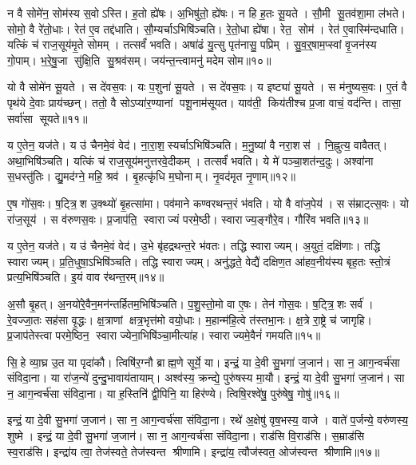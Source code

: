 न वै सोमे॑न॒ सोम॑स्य स॒वोऽस्ति।
ह॒तो ह्ये॑षः।
अ॒भिषु॑तो॒ ह्ये॑षः।
न हि ह॒तः सू॒यते।
सौ॒मी सू॒तव॑शा॒मा ल॑भते।
सोमो॒ वै रे॑तो॒धाः।
रेत॑ ए॒व तद्द॑धाति।
सौ॒म्यर्चाऽभिषि॑ञ्चति।
रे॒तो॒धा ह्ये॑षा।
रेत॒ सोम॑।
रेत॑ ए॒वास्मि॑न्दधाति।
यत्किं च॑ राज॒सूय॑मृ॒ते सोमम्।
तत्सर्वं॑ भवति।
अषा॑ढं यु॒त्सु पृत॑नासु॒ पप्रिम्।
सु॒व॒र्॒षाम॒प्स्वां वृ॒जन॑स्य गो॒पाम्।
भ॒रे॒षु॒जा सु॑क्षि॒ति सु॒श्रव॑सम्।
जय॑न्त॒न्त्वामनु॑ मदेम सोम॥१०॥\anuvakamend[रेत॒ सोम॑ स॒प्त च॑]

यो वै सोमे॑न सू॒यते।
स दे॑वस॒वः।
यः प॒शुना॑ सू॒यते।
स दे॑वस॒वः।
य इष्ट्या॑ सू॒यते।
स म॑नुष्यस॒वः।
ए॒तं वै पृथ॑ये दे॒वाः प्राय॑च्छन्।
ततो॒ वै सोऽप्या॑र॒ण्यानां पशू॒नाम॑सूयत।
याव॑ती॒ किय॑तीश्च प्र॒जा वाचं॒ वद॑न्ति।
तासा॒ सर्वा॑सा सूयते॥११॥

य ए॒तेन॒ यज॑ते।
य उ॑ चैनमे॒वं वेद॑।
ना॒रा॒श॒स्यर्चाऽभिषि॑ञ्चति।
म॒नु॒ष्या॑ वै नरा॒शस॑।
नि॒ह्नुत्य॒ वावैतत्।
अथा॒भिषि॑ञ्चति।
यत्किं च॑ राज॒सूय॑मनुत्तरवे॒दीकम्।
तत्सर्वं॑ भवति।
ये मे॑ पञ्चा॒शत॑न्द॒दुः।
अश्वा॑ना स॒धस्तु॑तिः।
द्यु॒मद॑ग्ने॒ महि॒ श्रव॑।
बृ॒हत्कृ॑धि म॒घोनाम्।
नृ॒वद॑मृत नृ॒णाम्॥१२॥\anuvakamend[सू॒य॒ते॒ स॒धस्तु॑ति॒स्त्रीणि॑ च]

ए॒ष गो॑स॒वः।
ष॒ट्त्रि॒श उ॒क्थ्यो॑ बृ॒हत्सा॑मा।
पव॑माने कण्वरथन्त॒रं भ॑वति।
यो वै वा॑ज॒पेय॑।
स स॑म्राट्त्स॒वः।
यो रा॑ज॒सूय॑।
स व॑रुणस॒वः।
प्र॒जाप॑ति॒ स्वाराज्यं परमे॒ष्ठी।
स्वाराज्य॒ङ्गौरे॒व।
गौरि॑व भवति॥१३॥

य ए॒तेन॒ यज॑ते।
य उ॑ चैनमे॒वं वेद॑।
उ॒भे बृ॑हद्रथन्त॒रे भ॑वतः।
तद्धि स्वाराज्यम्।
अ॒युतं॒ दक्षि॑णाः।
तद्धि स्वाराज्यम्।
प्र॒ति॒धुषा॒ऽभिषि॑ञ्चति।
तद्धि स्वाराज्यम्।
अनु॑द्धते॒ वेद्यै॑ दक्षिण॒त आ॑हव॒नीय॑स्य बृह॒तः स्तो॒त्रं प्रत्य॒भिषि॑ञ्चति।
इ॒यं वाव र॑थन्त॒रम्॥१४॥

अ॒सौ बृ॒हत्।
अ॒नयो॑रे॒वैन॒मन॑न्तर्\mbox{}हितम॒भिषि॑ञ्चति।
प॒शु॒स्तो॒मो वा ए॒षः।
तेन॑ गोस॒वः।
ष॒ट्त्रि॒शः सर्व॑।
रे॒वज्जा॒तः सह॑सा वृ॒द्धः।
क्ष॒त्राणां क्षत्र॒भृत्त॑मो वयो॒धाः।
म॒हान्म॑हि॒त्वे त॑स्तभा॒नः।
क्ष॒त्रे रा॒ष्ट्रे च॑ जागृहि।
प्र॒जाप॑तेस्त्वा परमे॒ष्ठिन॒ स्वाराज्येना॒भिषि॑ञ्चा॒मीत्या॑ह।
स्वाराज्यमे॒वैनं॑ गमयति॥१५॥\anuvakamend[इ॒व॒ भ॒व॒ति॒ र॒थ॒न्त॒रमा॒हैकं च]

सि॒हे व्या॒घ्र उ॒त या पृदा॑कौ।
त्विषि॑र॒ग्नौ ब्राह्म॒णे सूर्ये॒ या।
इन्द्रं॒ या दे॒वी सु॒भगा॑ ज॒जान॑।
सा न॒ आग॒न्वर्च॑सा संविदा॒ना।
या रा॑ज॒न्ये॑ दुन्दु॒भावाय॑तायाम्।
अश्व॑स्य॒ क्रन्द्ये॒ पुरु॑षस्य मा॒यौ।
इन्द्रं॒ या दे॒वी सु॒भगा॑ ज॒जान॑।
सा न॒ आग॒न्वर्च॑सा संविदा॒ना।
या ह॒स्तिनि॑ द्वी॒पिनि॒ या हिर॑ण्ये।
त्विषि॒रश्वे॑षु॒ पुरु॑षेषु॒ गोषु॑॥१६॥

इन्द्रं॒ या दे॒वी सु॒भगा॑ ज॒जान॑।
सा न॒ आग॒न्वर्च॑सा संविदा॒ना।
रथे॑ अ॒क्षेषु॑ वृष॒भस्य॒ वाजे।
वाते॑ प॒र्जन्ये॒ वरु॑णस्य॒ शुष्मे।
इन्द्रं॒ या दे॒वी सु॒भगा॑ ज॒जान॑।
सा न॒ आग॒न्वर्च॑सा संविदा॒ना।
राड॑सि वि॒राड॑सि।
स॒म्राड॑सि स्व॒राड॑सि।
इन्द्रा॑य त्वा॒ तेज॑स्वते॒ तेज॑स्वन्त श्रीणामि।
इन्द्रा॑य॒ त्वौज॑स्वत॒ ओज॑स्वन्त श्रीणामि॥१७॥


